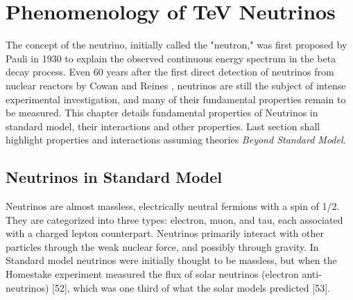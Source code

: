 \chapter{Phenomenology of TeV Neutrinos}
The concept of the neutrino, initially called the "neutron," was first proposed by Pauli in 1930  to explain the observed continuous energy spectrum in the beta decay process. Even 60 years after the first direct detection of neutrinos from nuclear reactors by Cowan and Reines , neutrinos are still the subject of intense experimental investigation, and many of their fundamental properties remain to be measured. This chapter details fundamental properties of Neutrinos in standard model, their interactions and other properties. Last section shall highlight properties and interactions assuming theories \emph{Beyond Standard Model}.
\section{Neutrinos in Standard Model}
\label{sec:sm_nu}
Neutrinos are almost massless, electrically neutral fermions with a spin of 1/2. They are categorized into three types: electron, muon, and tau, each associated with a charged lepton counterpart. Neutrinos primarily interact with other particles through the weak nuclear force, and possibly through gravity. In Standard model neutrinos were initially thought to be massless, but when the Homestake experiment measured the flux of solar neutrinos (electron anti-neutrinos) [52], which was one third of what the solar models predicted [53]. 

